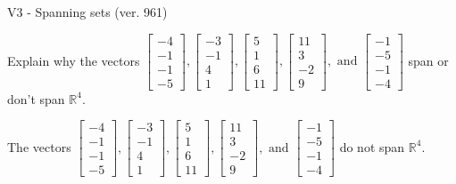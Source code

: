 \begin{exercise}
  \begin{exerciseTitle}V3 - Spanning sets (ver. 961)\end{exerciseTitle}
  \begin{exerciseStatement}
    Explain why the vectors \(\left[\begin{array}{r}
-4 \\
-1 \\
-1 \\
-5
\end{array}\right] , \left[\begin{array}{r}
-3 \\
-1 \\
4 \\
1
\end{array}\right] , \left[\begin{array}{r}
5 \\
1 \\
6 \\
11
\end{array}\right] , \left[\begin{array}{r}
11 \\
3 \\
-2 \\
9
\end{array}\right] , \text{ and } \left[\begin{array}{r}
-1 \\
-5 \\
-1 \\
-4
\end{array}\right]\) span or don't span \(\mathbb{R}^4\). 
	


  \end{exerciseStatement}
  \begin{exerciseAnswer}
   The vectors \(\left[\begin{array}{r}
-4 \\
-1 \\
-1 \\
-5
\end{array}\right] , \left[\begin{array}{r}
-3 \\
-1 \\
4 \\
1
\end{array}\right] , \left[\begin{array}{r}
5 \\
1 \\
6 \\
11
\end{array}\right] , \left[\begin{array}{r}
11 \\
3 \\
-2 \\
9
\end{array}\right] , \text{ and } \left[\begin{array}{r}
-1 \\
-5 \\
-1 \\
-4
\end{array}\right]\) 
  	 do not  
	span \(\mathbb{R}^4\).
  



\end{exerciseAnswer}
\end{exercise}
